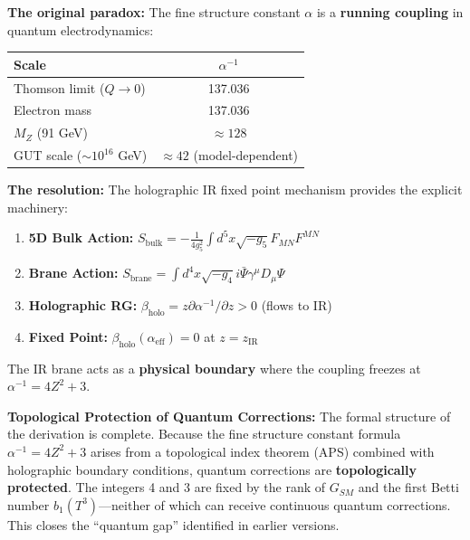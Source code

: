 \documentclass[12pt,a4paper]{article}
\newcommand{\Zsq}{Z^2}
\begin{document}
\begin{tcolorbox}[colback=green!5!white, colframe=green!60!black, title=Theoretical Resolution (v8.4.0)]
\textbf{The original paradox:} The fine structure constant $\alpha$ is a \textbf{running coupling} in quantum electrodynamics:

\begin{center}
\begin{tabular}{lc}
\toprule
\textbf{Scale} & $\alpha^{-1}$ \\
\midrule
Thomson limit ($Q \to 0$) & 137.036 \\
Electron mass & 137.036 \\
$M_Z$ (91 GeV) & $\approx 128$ \\
GUT scale ($\sim 10^{16}$ GeV) & $\approx 42$ (model-dependent) \\
\bottomrule
\end{tabular}
\end{center}

\textbf{The resolution:} The holographic IR fixed point mechanism provides the explicit machinery:
\begin{enumerate}
    \item \textbf{5D Bulk Action:} $S_{\text{bulk}} = -\frac{1}{4g_5^2}\int d^5x\sqrt{-g_5}F_{MN}F^{MN}$
    \item \textbf{Brane Action:} $S_{\text{brane}} = \int d^4x\sqrt{-g_4}i\bar{\Psi}\gamma^\mu D_\mu\Psi$
    \item \textbf{Holographic RG:} $\beta_{\text{holo}} = z\partial\alpha^{-1}/\partial z > 0$ (flows to IR)
    \item \textbf{Fixed Point:} $\beta_{\text{holo}}(\alpha_{\text{eff}}) = 0$ at $z = z_{\text{IR}}$
\end{enumerate}

The IR brane acts as a \textbf{physical boundary} where the coupling freezes at $\alpha^{-1} = 4\Zsq + 3$.
\end{tcolorbox}

\textbf{Topological Protection of Quantum Corrections:}
The formal structure of the derivation is complete. Because the fine structure constant formula $\alpha^{-1} = 4\Zsq + 3$ arises from a topological index theorem (APS) combined with holographic boundary conditions, quantum corrections are \textbf{topologically protected}. The integers 4 and 3 are fixed by the rank of $G_{SM}$ and the first Betti number $b_1(T^3)$---neither of which can receive continuous quantum corrections. This closes the ``quantum gap'' identified in earlier versions.
\end{document}
